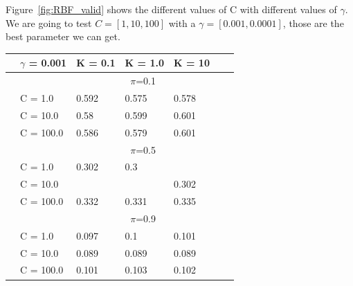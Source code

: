 \documentclass[english]{report}
\begin{document}
Figure~\ref{fig:RBF_valid} shows the different values of C with different values of $\gamma$.
We are going to test \(C = [1, 10, 100]\) with a \(\gamma = [0.001, 0.0001]\), those are the best parameter we can get.
\begin{table}[H]
    \centering
    
    \begin{tabular}{ll|lllll}
        \hline
                                & \textbf{$\gamma$ = 0.001} &         K = 0.1 & K = 1.0 & K = 10 \\ \hline
                                & & \multicolumn{3}{c}{$\pi$=0.1} \\ \hline
                                & C = 1.0    & 0.592 & 0.575 & 0.578    \\
                                & C = 10.0   & 0.58 & 0.599 & 0.601  \\
                                & C = 100.0   & 0.586 & 0.579 & 0.601  \\ \hline

                                & & \multicolumn{3}{c}{$\pi$=0.5} \\ \hline
                                & C = 1.0    & 0.302 & 0.3 & \color{red}{0.301}    \\
                                & C = 10.0   & \color{red}{0.293} & \color{red}{0.298} & 0.302  \\
                                & C = 100.0   & 0.332 & 0.331 & 0.335  \\ \hline

                                & & \multicolumn{3}{c}{$\pi$=0.9} \\ \hline
                                & C = 1.0    & 0.097 & 0.1 & 0.101    \\
                                & C = 10.0   & 0.089 & 0.089 & 0.089  \\
                                & C = 100.0   & 0.101 & 0.103 & 0.102  \\ 
    \hline
    \end{tabular}
    \label{tab:RBF1_valid}
\end{table}
\end{document}
